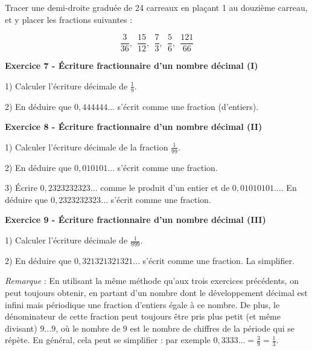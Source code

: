 \documentclass[14 pt]{extarticle}
\theoremstyle{plain}
\newcounter{n}
\numberwithin{n}{section}
\begin{document}
Tracer une demi-droite graduée de 24 carreaux en plaçant 1 au douzième carreau, et y placer les fractions suivantes : 

\[  \frac{3}{36}, \ \ \frac{15}{12}, \ \ \frac{7}{3}, \ \ \frac{5}{6}, \ \ \frac{121}{66}   \]


\textbf{Exercice 7 - Écriture fractionnaire d'un nombre décimal (I)}

1) Calculer l'écriture décimale de $\frac19$.

2) En déduire que $0,444444\ldots$ s'écrit comme une fraction (d'entiers). 

\textbf{Exercice 8 - Écriture fractionnaire d'un nombre décimal (II)}

1) Calculer l'écriture décimale de la fraction $\frac1{99}$. 

2) En déduire que $0,010101\ldots$ s'écrit comme une fraction. 

3) Écrire $0,2323232323\ldots$ comme le produit d'un entier et de $0,01010101\ldots$. En déduire que 
$0,2323232323\ldots$ s'écrit comme une fraction. 


\textbf{Exercice 9 - Écriture fractionnaire d'un nombre décimal (III)}

1) Calculer l'écriture décimale de $\frac1{999}$. 

2) En déduire que $0,321321321321\ldots$ s'écrit comme une fraction. La simplifier. 

\emph{Remarque} : En utilisant la même méthode qu'aux trois exercices précédents, on peut toujours obtenir, 
en partant d'un nombre dont le développement décimal est infini mais périodique une fraction d'entiers égale à ce nombre. De plus, le dénominateur de cette fraction peut toujours être pris plus petit (et même divisant) $9...9$, où le nombre de $9$ est le nombre de chiffres de la période qui se répète. En général, cela peut se simplifier : par exemple $0,3333\ldots = \frac39 = \frac13$. 
	
\end{document}
